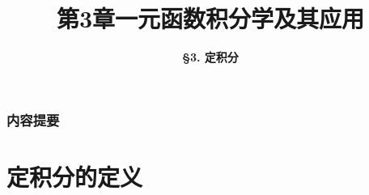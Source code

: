 

\title[高等数学]{\LARGE \bfseries 第3章\quad 一元函数积分学及其应用} %
\author[定积分] %
{\Large \bfseries \S 3. 定积分
}
\date{}



\begin{frame}
\titlepage %
\end{frame}

\begin{frame}
\frametitle{内容提要} %
\tableofcontents %
\end{frame}


\section{定积分的定义} %

